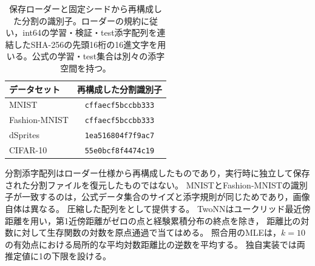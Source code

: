 \documentclass[11pt,a4paper]{ltjsarticle}
\begin{document}
\begin{table}[H]
\caption{保存ローダーと固定シードから再構成した分割の識別子。ローダーの規約に従い，int64の学習・検証・test添字配列を連結したSHA-256の先頭16桁の16進文字を用いる。公式の学習・test集合は別々の添字空間を持つ。}\label{tab:splits}
\small
\setlength{\tabcolsep}{3.5pt}
\begin{tabular*}{\textwidth}{@{\extracolsep{\fill}}lc@{}}
\toprule
データセット & 再構成した分割識別子 \\
\midrule
MNIST & \texttt{cffaecf5bccbb333} \\
Fashion-MNIST & \texttt{cffaecf5bccbb333} \\
dSprites & \texttt{1ea516804f7f9ac7} \\
CIFAR-10 & \texttt{55e0bcf8f4474c19} \\
\bottomrule
\end{tabular*}
\end{table}
分割添字配列はローダー仕様から再構成したものであり，実行時に独立して保存された分割ファイルを復元したものではない。
MNISTとFashion-MNISTの識別子が一致するのは，公式データ集合のサイズと添字規則が同じためであり，画像自体は異なる。
圧縮した配列をとして提供する。
TwoNNはユークリッド最近傍距離を用い，第1近傍距離がゼロの点と経験累積分布の終点を除き，
距離比の対数に対して生存関数の対数を原点通過で当てはめる。
照合用のMLEは，$k=10$の有効点における局所的な平均対数距離比の逆数を平均する。
独自実装では両推定値に1の下限を設ける。
\end{document}
